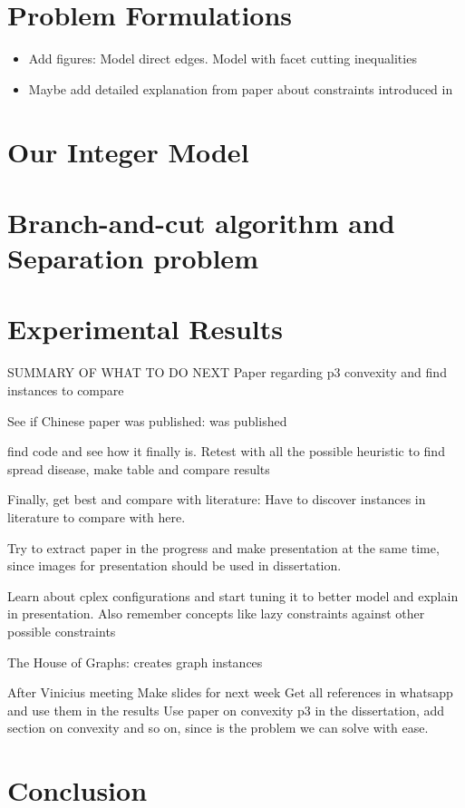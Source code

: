 \documentclass[msc]{ppgccufmg}    %
\begin{document}

\chapter{Problem Formulations}

\begin{itemize}
    \item Add figures: Model direct edges. Model with facet cutting inequalities 
    \item Maybe add detailed explanation from paper about constraints introduced in \cite{Soltani2019}
\end{itemize}

\chapter{Our Integer Model}


\chapter{Branch-and-cut algorithm and Separation problem}



\chapter{Experimental Results}


SUMMARY OF WHAT TO DO NEXT
Paper regarding p3 convexity and find instances to compare 

See if Chinese paper was published: was published

find code and see how it finally is. Retest with all the possible heuristic to find spread disease, make table and compare results

Finally, get best and compare with literature: Have to discover instances in literature to compare with here.

Try to extract paper in the progress and make presentation at the same time, since images for presentation should be used in dissertation.


Learn about cplex configurations and start tuning it to better model and explain in presentation. Also remember concepts like lazy constraints against other possible constraints

The House of Graphs: creates graph instances 


After Vinicius meeting
Make slides for next week
Get all references in whatsapp and use them in the results
Use paper on convexity p3 in the dissertation, add section on convexity and so on, since is the problem we can solve  with ease. 

\chapter{Conclusion}


\end{document}
